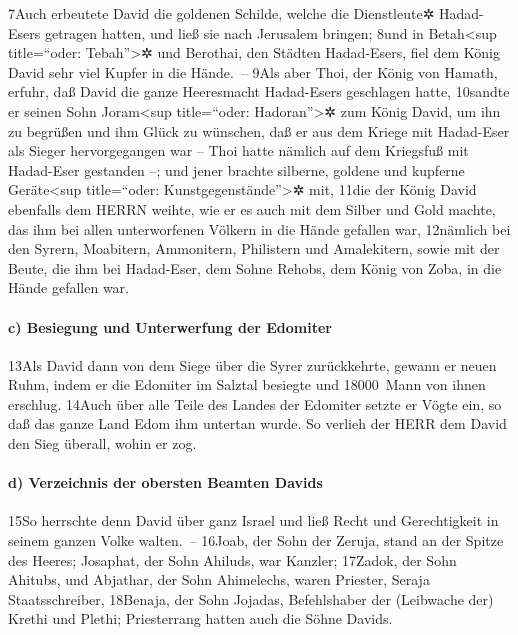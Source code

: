 7Auch erbeutete David die goldenen Schilde, welche die Dienstleute✲
Hadad-Esers getragen hatten, und ließ sie nach Jerusalem bringen; 8und
in Betah\textless sup title=``oder: Tebah''\textgreater✲ und Berothai,
den Städten Hadad-Esers, fiel dem König David sehr viel Kupfer in die
Hände.~-- 9Als aber Thoi, der König von Hamath, erfuhr, daß David die
ganze Heeresmacht Hadad-Esers geschlagen hatte, 10sandte er seinen Sohn
Joram\textless sup title=``oder: Hadoran''\textgreater✲ zum König David,
um ihn zu begrüßen und ihm Glück zu wünschen, daß er aus dem Kriege mit
Hadad-Eser als Sieger hervorgegangen war -- Thoi hatte nämlich auf dem
Kriegsfuß mit Hadad-Eser gestanden --; und jener brachte silberne,
goldene und kupferne Geräte\textless sup title=``oder:
Kunstgegenstände''\textgreater✲ mit, 11die der König David ebenfalls dem
HERRN weihte, wie er es auch mit dem Silber und Gold machte, das ihm bei
allen unterworfenen Völkern in die Hände gefallen war, 12nämlich bei den
Syrern, Moabitern, Ammonitern, Philistern und Amalekitern, sowie mit der
Beute, die ihm bei Hadad-Eser, dem Sohne Rehobs, dem König von Zoba, in
die Hände gefallen war.

\hypertarget{c-besiegung-und-unterwerfung-der-edomiter}{%
\paragraph{c) Besiegung und Unterwerfung der
Edomiter}\label{c-besiegung-und-unterwerfung-der-edomiter}}

13Als David dann von dem Siege über die Syrer zurückkehrte, gewann er
neuen Ruhm, indem er die Edomiter im Salztal besiegte und 18000~Mann von
ihnen erschlug. 14Auch über alle Teile des Landes der Edomiter setzte er
Vögte ein, so daß das ganze Land Edom ihm untertan wurde. So verlieh der
HERR dem David den Sieg überall, wohin er zog.

\hypertarget{d-verzeichnis-der-obersten-beamten-davids}{%
\paragraph{d) Verzeichnis der obersten Beamten
Davids}\label{d-verzeichnis-der-obersten-beamten-davids}}

15So herrschte denn David über ganz Israel und ließ Recht und
Gerechtigkeit in seinem ganzen Volke walten.~-- 16Joab, der Sohn der
Zeruja, stand an der Spitze des Heeres; Josaphat, der Sohn Ahiluds, war
Kanzler; 17Zadok, der Sohn Ahitubs, und Abjathar, der Sohn Ahimelechs,
waren Priester, Seraja Staatsschreiber, 18Benaja, der Sohn Jojadas,
Befehlshaber der (Leibwache der) Krethi und Plethi; Priesterrang hatten
auch die Söhne Davids.

